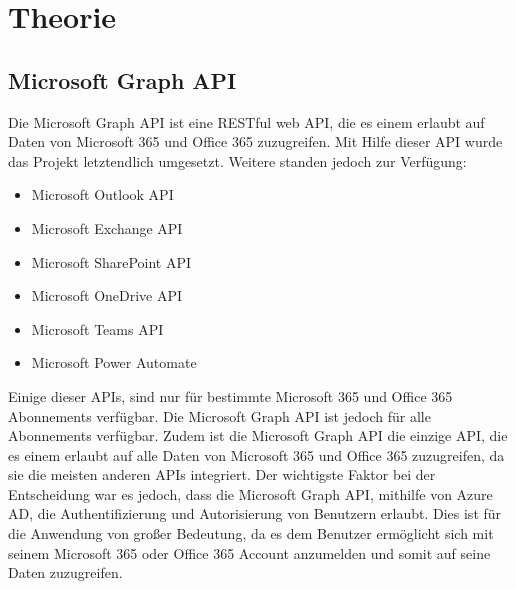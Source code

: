 


\section{Theorie}\label{sec:theorie}

\subsection{Microsoft Graph API}\label{subsec:microsoft-graph-api}
Die Microsoft Graph API ist eine RESTful web API, die es einem erlaubt auf Daten von Microsoft 365 und Office 365 zuzugreifen.
Mit Hilfe dieser API wurde das Projekt letztendlich umgesetzt.
Weitere standen jedoch zur Verfügung:
\begin{itemize}
    \item Microsoft Outlook API
    \item Microsoft Exchange API
    \item Microsoft SharePoint API
    \item Microsoft OneDrive API
    \item Microsoft Teams API
    \item Microsoft Power Automate
\end{itemize}
Einige dieser APIs, sind nur für bestimmte Microsoft 365 und Office 365 Abonnements verfügbar.
Die Microsoft Graph API ist jedoch für alle Abonnements verfügbar.
Zudem ist die Microsoft Graph API die einzige API, die es einem erlaubt auf alle Daten von Microsoft 365 und Office 365 zuzugreifen, da sie die meisten anderen APIs integriert.
Der wichtigste Faktor bei der Entscheidung war es jedoch, dass die Microsoft Graph API, mithilfe von Azure AD, die Authentifizierung und Autorisierung von Benutzern erlaubt. Dies ist für die Anwendung von großer Bedeutung, da es dem Benutzer ermöglicht sich mit seinem Microsoft 365 oder Office 365 Account anzumelden und somit auf seine Daten zuzugreifen.

